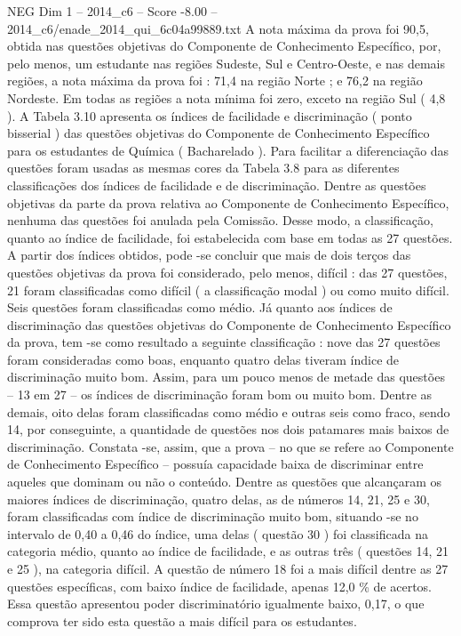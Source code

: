 \begin{textsample}{NEG Dim 1 – 2014\_c6 – Score -8.00 – 2014\_c6/enade\_2014\_qui\_6c04a99889.txt}
A nota máxima da prova foi 90,5, obtida nas questões objetivas do Componente de Conhecimento Específico, por, pelo menos, um estudante nas regiões Sudeste, Sul e Centro-Oeste, e nas demais regiões, a nota máxima da prova foi : 71,4 na região Norte ; e 76,2 na região Nordeste.
Em todas as regiões a nota mínima foi zero, exceto na região Sul ( 4,8 ).
A Tabela 3.10 apresenta os índices de facilidade e discriminação ( ponto bisserial ) das questões objetivas do Componente de Conhecimento Específico para os estudantes de Química ( Bacharelado ).
Para facilitar a diferenciação das questões foram usadas as mesmas cores da Tabela 3.8 para as diferentes classificações dos índices de facilidade e de discriminação.
Dentre as questões objetivas da parte da prova relativa ao Componente de Conhecimento Específico, nenhuma das questões foi anulada pela Comissão.
Desse modo, a classificação, quanto ao índice de facilidade, foi estabelecida com base em todas as 27 questões.
A partir dos índices obtidos, pode -se concluir que mais de dois terços das questões objetivas da prova foi considerado, pelo menos, difícil : das 27 questões, 21 foram classificadas como difícil ( a classificação modal ) ou como muito difícil.
Seis questões foram classificadas como médio.
Já quanto aos índices de discriminação das questões objetivas do Componente de Conhecimento Específico da prova, tem -se como resultado a seguinte classificação : nove das 27 questões foram consideradas como boas, enquanto quatro delas tiveram índice de discriminação muito bom.
Assim, para um pouco menos de metade das questões – 13 em 27 – os índices de discriminação foram bom ou muito bom.
Dentre as demais, oito delas foram classificadas como médio e outras seis como fraco, sendo 14, por conseguinte, a quantidade de questões nos dois patamares mais baixos de discriminação.
Constata -se, assim, que a prova – no que se refere ao Componente de Conhecimento Específico – possuía capacidade baixa de discriminar entre aqueles que dominam ou não o conteúdo.
Dentre as questões que alcançaram os maiores índices de discriminação, quatro delas, as de números 14, 21, 25 e 30, foram classificadas com índice de discriminação muito bom, situando -se no intervalo de 0,40 a 0,46 do índice, uma delas ( questão 30 ) foi classificada na categoria médio, quanto ao índice de facilidade, e as outras três ( questões 14, 21 e 25 ), na categoria difícil.
A questão de número 18 foi a mais difícil dentre as 27 questões específicas, com baixo índice de facilidade, apenas 12,0 \% de acertos.
Essa questão apresentou poder discriminatório igualmente baixo, 0,17, o que comprova ter sido esta questão a mais difícil para os estudantes.

\end{textsample}
